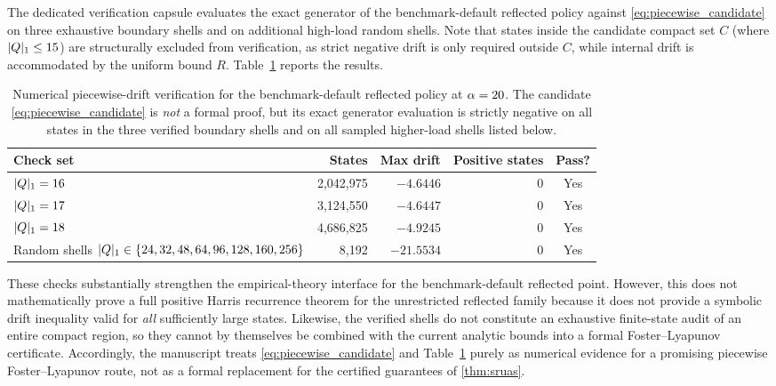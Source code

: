 The dedicated verification capsule evaluates the exact generator of the benchmark-default reflected policy against \cref{eq:piecewise_candidate} on three exhaustive boundary shells and on additional high-load random shells. Note that states inside the candidate compact set $C$ (where $|Q|_1 \le 15$) are structurally excluded from verification, as strict negative drift is only required outside $C$, while internal drift is accommodated by the uniform bound $R$.
Table~\ref{tab:piecewise_candidate} reports the results.

\begin{table}[htbp]
\centering
\small
\caption{Numerical piecewise-drift verification for the benchmark-default reflected policy at $\alpha=20$. The candidate \eqref{eq:piecewise_candidate} is \emph{not} a formal proof, but its exact generator evaluation is strictly negative on all states in the three verified boundary shells and on all sampled higher-load shells listed below.}
\label{tab:piecewise_candidate}
\renewcommand{\arraystretch}{1.2}
\begin{tabular}{@{}l r r r c@{}}
\toprule
\textbf{Check set} & \textbf{States} & \textbf{Max drift} & \textbf{Positive states} & \textbf{Pass?} \\
\midrule
$|Q|_1 = 16$ & 2{,}042{,}975 & $-4.6446$ & 0 & Yes \\
$|Q|_1 = 17$ & 3{,}124{,}550 & $-4.6447$ & 0 & Yes \\
$|Q|_1 = 18$ & 4{,}686{,}825 & $-4.9245$ & 0 & Yes \\
Random shells $|Q|_1 \in \{24,32,48,64,96,128,160,256\}$ & 8{,}192 & $-21.5534$ & 0 & Yes \\
\bottomrule
\end{tabular}
\end{table}

These checks substantially strengthen the empirical-theory interface for the benchmark-default reflected point.
However, this does not mathematically prove a full positive Harris recurrence theorem for the unrestricted reflected family because it does not provide a symbolic drift inequality valid for \emph{all} sufficiently large states.
Likewise, the verified shells do not constitute an exhaustive finite-state audit of an entire compact region, so they cannot by themselves be combined with the current analytic bounds into a formal Foster--Lyapunov certificate.
Accordingly, the manuscript treats \cref{eq:piecewise_candidate} and Table~\ref{tab:piecewise_candidate} purely as numerical evidence for a promising piecewise Foster--Lyapunov route, not as a formal replacement for the certified guarantees of \cref{thm:sruas}.
